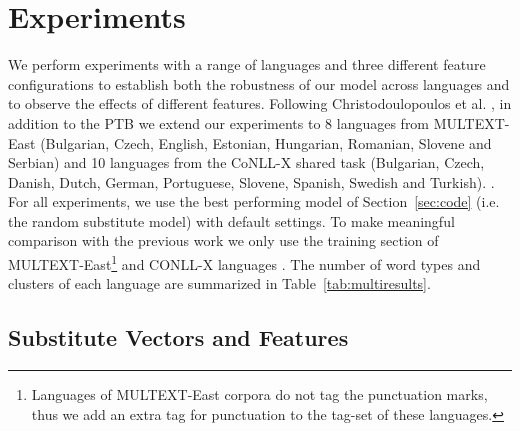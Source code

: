 \section{Experiments}
\label{sec:multilang}
\noindent We perform experiments with a range of languages and three
different feature configurations to establish both the robustness of
our model across languages and to observe the effects of different
features.  Following Christodoulopoulos et
al. , in
addition to the PTB we extend our experiments to 8 languages from
MULTEXT-East (Bulgarian, Czech, English, Estonian, Hungarian,
Romanian, Slovene and Serbian) \cite{citeulike:5820223} and 10
languages from the CoNLL-X shared task (Bulgarian, Czech, Danish,
Dutch, German, Portuguese, Slovene, Spanish, Swedish and Turkish).
\cite{Buchholz:2006:CST:1596276.1596305}.  For all experiments, we use
the best performing model of Section~\ref{sec:code} (i.e. the random
substitute model) with default settings.  To make meaningful
comparison with the previous work we only use the training section of
MULTEXT-East\footnote{Languages of MULTEXT-East corpora do not tag the
  punctuation marks, thus we add an extra tag for punctuation to the
  tag-set of these languages.} and CONLL-X languages
\cite{Lee:2010:STU:1870658.1870741}.  The number of word types and
clusters of each language are summarized in
Table~\ref{tab:multiresults}.

\subsection{Substitute Vectors and Features}

